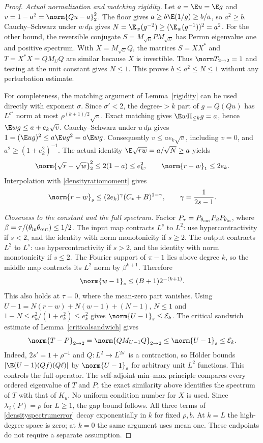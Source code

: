 \begin{proof}
\emph{Actual normalization and matching rigidity.}
Let $a=\E u=\E g$ and $v=1-a^2=\norm{Qu-a}_2^2$.
The floor gives $a\geq b\E(1/g)\geq b/a$, so $a^2\geq b$.
Cauchy--Schwarz under $w\,d\mu$ gives
$N=\E_w(g^{-2})\geq(\E_w(g^{-1}))^2=a^2$.
For the other bound, the reversible conjugate
$S=M_{\sqrt U}PM_{\sqrt U}$ has Perron eigenvalue one and positive
spectrum. With $X=M_{\sqrt U}Q$, the matrices $S=XX^*$ and
$T=X^*X=QM_UQ$ are similar because $X$ is invertible. Thus
$\norm T_{2\to2}=1$ and testing at the unit constant gives $N\leq1$.
This proves $b\leq a^2\leq N\leq1$ without any perturbation estimate.

For completeness, the matching argument of Lemma~\ref{rigidity} can
be used directly with exponent $\sigma$. Since $\sigma'<2$, the
degree-$>k$ part of $g=Q(Qu)$ has $L^{\sigma'}$ norm at most
$\rho^{(k+1)/2}\sqrt v$. Exact matching gives
$\E w\Pi_{\leq k}g=a$, hence
$\E wg\leq a+e_k\sqrt v$.
Cauchy--Schwarz under $u\,d\mu$ gives
$1=(\E ug)^2\leq a\E ug^2=a\E wg$.
Consequently $v\leq ae_k\sqrt v$, including $v=0$, and
$a^2\geq(1+e_k^2)^{-1}$.
The actual identity $\E\sqrt{rw}=a/\sqrt N\geq a$ yields
\[
 \norm{\sqrt r-\sqrt w}_2^2
       \leq2(1-a)\leq e_k^2,\qquad \norm{r-w}_1\leq2e_k.
\]
Interpolation with \eqref{densityratiomoment} gives
\begin{equation}\label{densitycriticalcloseness}
 \norm{r-w}_s\leq(2e_k)^\gamma(C_*+B)^{1-\gamma},
 \qquad \gamma=\frac1{2s-1}.
\end{equation}

\emph{Closeness to the constant and the full spectrum.}
Factor $P_\tau=P_{\theta_{\rm out}}P_\beta P_{\theta_{\rm in}}$,
where $\beta=\tau/(\theta_{\rm in}\theta_{\rm out})\leq1/2$.
The input map contracts $L^s$ to $L^2$: use hypercontractivity if
$s<2$, and the identity with norm monotonicity if $s\geq2$.
The output contracts $L^2$ to $L^s$: use hypercontractivity if $s>2$,
and the identity with norm monotonicity if $s\leq2$.
The Fourier support of $\pi-1$ lies above degree $k$, so the middle
map contracts its $L^2$ norm by $\beta^{k+1}$. Therefore
\[
 \norm{w-1}_s\leq(B+1)2^{-(k+1)}.
\]
This also holds at $\tau=0$, where the mean-zero part vanishes.
Using $U-1=N(r-w)+N(w-1)+(N-1)$, $N\leq1$ and
$1-N\leq e_k^2/(1+e_k^2)\leq e_k^2$ gives
$\norm{U-1}_s\leq\mathcal E_k$.
The critical sandwich estimate of Lemma~\ref{criticalsandwich} gives
\[
 \norm{T-P}_{2\to2}=\norm{QM_{U-1}Q}_{2\to2}
              \leq\norm{U-1}_s\leq\mathcal E_k.
\]
Indeed, $2s'=1+\rho^{-1}$ and $Q:L^2\to L^{2s'}$ is a contraction,
so H\"older bounds $|\E(U-1)(Qf)(Q\ell)|$ by $\norm{U-1}_s$ for
arbitrary unit $L^2$ functions. This controls the full operator.
The self-adjoint min--max principle compares every ordered eigenvalue
of $T$ and $P$; the exact similarity above identifies the spectrum of
$T$ with that of $K_u$. No uniform condition number for $X$ is used.
Since $\lambda_2(P)=\rho$ for $L\geq1$, the gap bound follows.
All three terms of \eqref{densityspectrumerror} decay exponentially in
$k$ for fixed $\rho,b$. At $k=L$ the high-degree space is zero; at
$k=0$ the same argument uses mean one. These endpoints do not require
a separate assumption.
\end{proof}

